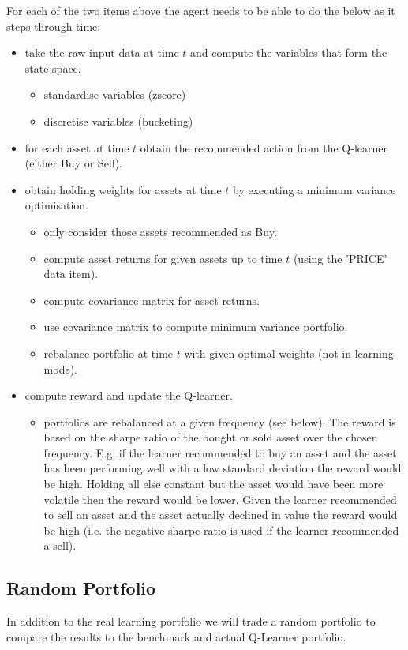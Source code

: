 \documentclass[dvips,12pt]{article}
\begin{document}
For each of the two items above the agent needs to be able to do the below as it steps through time:
\begin{itemize}
\item take the raw input data at time $t$ and compute the variables that form the state space.
	\begin{itemize}
		\item standardise variables (zscore)
		\item discretise variables (bucketing)
		\end{itemize}
\item for each asset at time $t$ obtain the recommended action from the Q-learner (either Buy or Sell).
 \item obtain holding weights for assets at time $t$ by executing a minimum variance optimisation.
 	\begin{itemize}
 		\item only consider those assets recommended as Buy.
 		\item compute asset returns for given assets up to time $t$ (using the 'PRICE' data item).
 		\item compute covariance matrix for asset returns.
 		\item use covariance matrix to compute minimum variance portfolio\cite{sharpe1972}.
 		\item rebalance portfolio at time $t$ with given optimal weights (not in learning mode).
 	\end{itemize}
\item compute reward and update the Q-learner.
	\begin{itemize}
		\item portfolios are rebalanced at a given frequency (see below). The reward is based on the sharpe ratio of the bought or sold asset over the chosen frequency. E.g. if the learner recommended to buy an asset and the asset has been performing well with a low standard deviation the reward would be high. Holding all else constant but the asset would have been more volatile then the reward would be lower. Given the learner recommended to sell an asset and the asset actually declined in value the reward would be high (i.e. the negative sharpe ratio is used if the learner recommended a sell).
	\end{itemize}
\end{itemize}

\subsection*{Random Portfolio}
In addition to the real learning portfolio we will trade a random portfolio to compare the results to the benchmark and actual Q-Learner portfolio.
\end{document}
